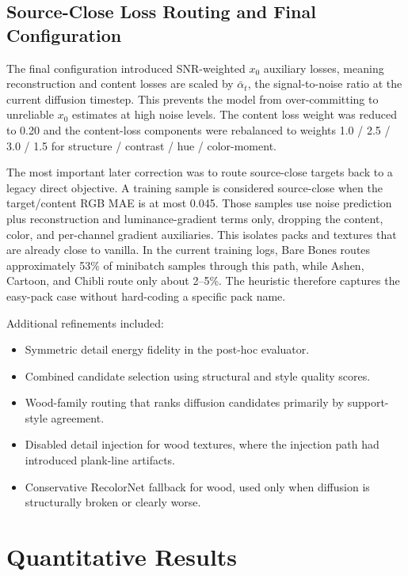 \subsection{Source-Close Loss Routing and Final Configuration}

The final configuration introduced SNR-weighted $x_0$ auxiliary losses, meaning
reconstruction and content losses are scaled by $\bar{\alpha}_t$, the
signal-to-noise ratio at the current diffusion timestep. This prevents the
model from over-committing to unreliable $x_0$ estimates at high noise levels.
The content loss weight was reduced to 0.20 and the content-loss components
were rebalanced to weights 1.0 / 2.5 / 3.0 / 1.5 for structure / contrast /
hue / color-moment.

The most important later correction was to route source-close targets back to a
legacy direct objective. A training sample is considered source-close when the
target/content RGB MAE is at most 0.045. Those samples use noise prediction
plus reconstruction and luminance-gradient terms only, dropping the content,
color, and per-channel gradient auxiliaries. This isolates packs and textures
that are already close to vanilla. In the current training logs, Bare Bones
routes approximately 53\% of minibatch samples through this path, while Ashen,
Cartoon, and Chibli route only about 2--5\%. The heuristic therefore captures
the easy-pack case without hard-coding a specific pack name.

Additional refinements included:
\begin{itemize}
    \item Symmetric detail energy fidelity in the post-hoc evaluator.
    \item Combined candidate selection using structural and style quality scores.
    \item Wood-family routing that ranks diffusion candidates primarily by support-style agreement.
    \item Disabled detail injection for wood textures, where the injection path had introduced plank-line artifacts.
    \item Conservative RecolorNet fallback for wood, used only when diffusion is structurally broken or clearly worse.
\end{itemize}

\section{Quantitative Results}

